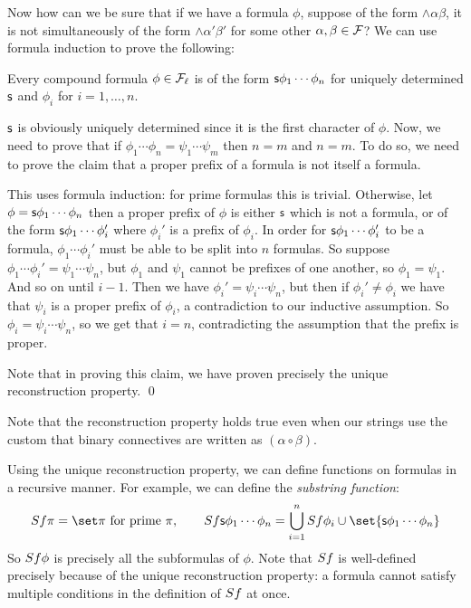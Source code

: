\elemm

Now how can we be sure that if we have a formula $\phi$, suppose of the form $\land\alpha\beta$,
it is not simultaneously of the form $\land\alpha'\beta'$ for some other
$\alpha,\beta\in{\cal F}$?
We can use formula induction to prove the following:

\blemm[title=The Unique Formula Reconstruction Property]

    Every compound formula $\phi\in{\cal F}_\ell$ is of the form ${\sf s}\phi_1\cdots\phi_n$ for
    uniquely determined ${\sf s}$ and $\phi_i$ for $i=1,\dots,n$.

\elemm

\Proof ${\sf s}$ is obviously uniquely determined since it is the first character of $\phi$.
Now, we need to prove that if $\phi_1\cdots\phi_n=\psi_1\cdots\psi_m$ then $n=m$ and $n=m$.
To do so, we need to prove the claim that a proper prefix of a formula is not itself a formula.

This uses formula induction: for prime formulas this is trivial.
Otherwise, let $\phi={\sf s}\phi_1\cdots\phi_n$ then a proper prefix of $\phi$ is either ${\sf s}$ which
is not a formula, or of the form ${\sf s}\phi_1\cdots\phi_i'$ where $\phi_i'$ is a prefix of
$\phi_i$.
In order for ${\sf s}\phi_1\cdots\phi_i'$ to be a formula, $\phi_1\cdots\phi_i'$ must be able to be
split into $n$ formulas.
So suppose $\phi_1\cdots\phi_i'=\psi_1\cdots\psi_n$, but $\phi_1$ and $\psi_1$ cannot be prefixes
of one another, so $\phi_1=\psi_1$.
And so on until $i-1$.
Then we have $\phi_i'=\psi_i\cdots\psi_n$, but then if $\phi_i'\neq\phi_i$ we have that $\psi_i$
is a proper prefix of $\phi_i$, a contradiction to our inductive assumption.
So $\phi_i=\psi_i\cdots\psi_n$, so we get that $i=n$, contradicting the assumption that the prefix
is proper.

Note that in proving this claim, we have proven precisely the unique reconstruction property.
\qed

Note that the reconstruction property holds true even when our strings use the custom that binary
connectives are written as $(\alpha\circ\beta)$.

Using the unique reconstruction property, we can define functions on formulas in a recursive
manner.
For example, we can define the {\it substring function}:
$$ {\sl Sf}\pi=\set\pi\hbox{ for prime $\pi$},
\qquad {\sl Sf}\s s\phi_1\cdots\phi_n=\bigcup_{i=1}^n{\sl Sf}\phi_i\cup
\set{\s s\phi_1\cdots\phi_n} $$
So ${\sl Sf}\phi$ is precisely all the subformulas of $\phi$.
Note that ${\sl Sf}$ is well-defined precisely because of the unique reconstruction property: a
formula cannot satisfy multiple conditions in the definition of ${\sl Sf}$ at once.

